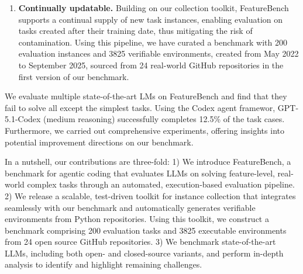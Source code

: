 \documentclass{article}
\def\name{FeatureBench }
\def\namenospace{FeatureBench}
\begin{document}
\begin{enumerate}[label=\textbf{\arabic*.},leftmargin=10pt,itemindent=0pt]
    \item \textbf{Continually updatable.} Building on our collection toolkit, \name supports a continual supply of new task instances, enabling evaluation on tasks created after their training date, thus mitigating the risk of contamination. Using this pipeline, we have curated a benchmark with 200 evaluation instances and 3825 verifiable environments, created from May 2022 to September 2025, sourced from 24 real-world GitHub repositories in the first version of our benchmark. 
\end{enumerate}

We evaluate multiple state-of-the-art LMs on \name and find that they fail to solve all except the simplest tasks. Using the Codex agent framewor, GPT-5.1-Codex (medium reasoning) successfully completes 12.5\% of the task cases. Furthermore, we carried out comprehensive experiments, offering insights into potential improvement directions on our benchmark.

In a nutshell, our contributions are three-fold: 1) We introduce \namenospace, a benchmark for agentic coding that evaluates LLMs on solving feature-level, real-world complex tasks through an automated, execution-based evaluation pipeline. 2) We release a scalable, test-driven toolkit for instance collection that integrates seamlessly with our benchmark and automatically generates verifiable environments from Python repositories. Using this toolkit, we construct a benchmark comprising 200 evaluation tasks and 3825 executable environments from 24 open source GitHub repositories.  3) We benchmark state-of-the-art LLMs, including both open- and closed-source variants, and perform in-depth analysis to identify and highlight remaining challenges. 
\end{document}
